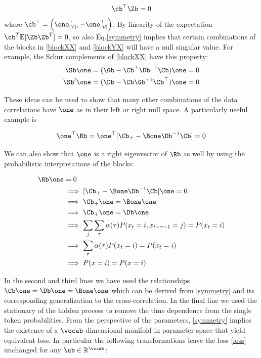 \documentclass{article}
\begin{document}
\begin{equation}\label{symmetry}
    \cb^\top \Zb = 0
\end{equation}
where $\cb^\top = \left(\one^\top_{\vert\mathcal{V}\vert}, -\one^\top_{\vert\mathcal{V}\vert}\right)$. By linearity of the expectation $\cb^T \mathbb{E}[\Zb\Zb^T] = 0$, so also Eq.\ref{symmetry} implies that certain combinations of the blocks in \eqref{blockXX} and \eqref{blockYX} will have a null singular value. For example, the Schur complements of \eqref{blockXX} have this property:
\begin{align}
    \Sb\one &= (\Gb - \Cb^\top \Db^{-1}\Cb)\one = 0 \label{snull}\\
    \Sb'\one &= (\Db - \Cb \Gb^{-1}\Cb^\top)\one = 0
\end{align}

These ideas can be used to show that many other combinations of the data correlations have $\one$ as in their left or right null space. A particularly useful example is 

\begin{equation}\label{rnull_left}
    \one^\top\Rb = \one^\top[\Cb_+ - \Bone\Db^{-1}\Cb] = 0  
\end{equation}

We can also show that $\one$ is a right eigenvector of $\Rb$ as well by using the probabilistic interpretations of the blocks:

\begin{align}
    \Rb \one &= 0 \label{rnull_right}\\
    &\implies [\Cb_+ - \Bone\Db^{-1}\Cb]\one = 0 \\
    &\implies \Cb_+\one = \Bone\one \\
    &\implies \Cb_+\one = \Db\one \\
    &\implies \sum_j \sum_\tau \alpha(\tau)P(x_{t} = i, x_{t-\tau-1} = j) = P(x_t = i) \\
    &\implies \sum_\tau \alpha(\tau)P(x_{t} = i) = P(x_t = i) \\
    &\implies P(x = i) = P(x = i)
\end{align}

In the second and third lines we have used the relationships $\Cb\one = \Db\one = \Bone\one $ which can be derived from \eqref{symmetry} and its corresponding generalization to the cross-correlation. In the final line we used the stationary of the hidden process to remove the time dependence from the single token probabilities. From the perspective of the parameters, \eqref{symmetry} implies the existence of a $\vocab$-dimensional manifold in parameter space that yield equivalent loss. In particular the following transformations leave the loss \eqref{loss} unchanged for any $\ub \in \mathbb{R}^{\vocab}$:
\end{document}
